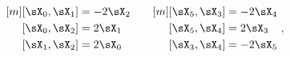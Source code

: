 \begin{equation*}
  \begin{aligned}[m]
    [\sX_0,\sX_1] &= -2 \sX_2 \\
    [\sX_0,\sX_2] &= 2 \sX_1 \\
    [\sX_1,\sX_2] &= 2 \sX_0
  \end{aligned}\qquad
  \begin{aligned}[m]
    [\sX_5,\sX_3] &= - 2 \sX_4 \\
    [\sX_5,\sX_4] &= 2 \sX_3 \\
    [\sX_3,\sX_4] &= - 2 \sX_5
  \end{aligned}~,
\end{equation*}

